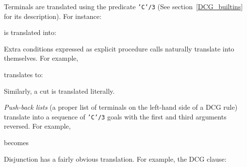Terminals are translated using the predicate {\tt 'C'/3} (See 
section~\ref{DCG_builtins} for its description).  For instance:


\noindent
is translated into:


Extra conditions expressed as explicit procedure calls naturally translate
into themselves. For example,


\noindent
translates to:


Similarly, a cut is translated literally.

{\em Push-back lists} (a proper list of terminals on the left-hand side of 
a DCG rule) translate into a sequence of {\tt 'C'/3} goals with the first 
and third arguments reversed.
For example,


\noindent
becomes


Disjunction has a fairly obvious translation.  For example, the DCG clause:

